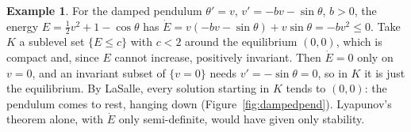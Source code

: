 \documentclass[11pt,a4paper]{article}
\numberwithin{equation}{section}
\theoremstyle{definition}
\newtheorem{exa}[thm]{Example}
\begin{document}
\begin{exa}
\label{ex:dampedpend}
For the damped pendulum $\theta' = v$, $v' = -bv - \sin\theta$, $b > 0$, the energy $E = \frac12v^2 + 1 - \cos\theta$ has $\dot E = v(-bv - \sin\theta) + v\sin\theta = -bv^2 \leq 0$. Take $K$ a sublevel set $\{E \leq c\}$ with $c < 2$
around the equilibrium $(0, 0)$, which is compact and, since $E$ cannot increase, positively invariant. Then $\dot E = 0$ only on $v = 0$, and an invariant subset of $\{v = 0\}$ needs $v' = -\sin\theta = 0$, so in $K$ it is
just the equilibrium. By LaSalle, every solution starting in $K$ tends to $(0, 0)$: the pendulum comes to rest, hanging down (Figure~\ref{fig:dampedpend}). Lyapunov's theorem alone, with $\dot E$ only
semi-definite, would have given only stability.
\end{exa}
\end{document}

